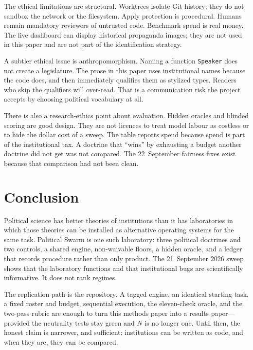 \documentclass[11pt,a4paper]{article}
\begin{document}
The ethical limitations are structural. Worktrees isolate Git history; they do not
sandbox the network or the filesystem. Apply protection is procedural. Humans remain
mandatory reviewers of untrusted code. Benchmark spend is real money. The live dashboard
can display historical propaganda images; they are not used in this paper and are not
part of the identification strategy.

A subtler ethical issue is anthropomorphism. Naming a function \texttt{Speaker} does not
create a legislature. The prose in this paper uses institutional names because the code
does, and then immediately qualifies them as stylized types. Readers who skip the
qualifiers will over-read. That is a communication risk the project accepts by choosing
political vocabulary at all.

There is also a research-ethics point about evaluation. Hidden oracles and blinded
scoring are good design. They are not licences to treat model labour as costless or to
hide the dollar cost of a sweep. The table reports spend because spend is part of the
institutional tax. A doctrine that ``wins'' by exhausting a budget another doctrine did
not get was not compared. The 22~September fairness fixes exist because that comparison
had not been clean.

\section{Conclusion}
\label{sec:conclusion}

Political science has better theories of institutions than it has laboratories in which
those theories can be installed as alternative operating systems for the same task.
Political Swarm is one such laboratory: three political doctrines and two controls, a
shared engine, non-waivable floors, a hidden oracle, and a ledger that records procedure
rather than only product. The 21~September 2026 sweep shows that the laboratory functions
and that institutional bugs are scientifically informative. It does not rank regimes.

The replication path is the repository. A tagged engine, an identical starting task, a
fixed roster and budget, sequential execution, the eleven-check oracle, and the two-pass
rubric are enough to turn this methods paper into a results paper---provided the
neutrality tests stay green and $N$ is no longer one. Until then, the honest claim is
narrower, and sufficient: institutions can be written as code, and when they are, they
can be compared.
\end{document}
